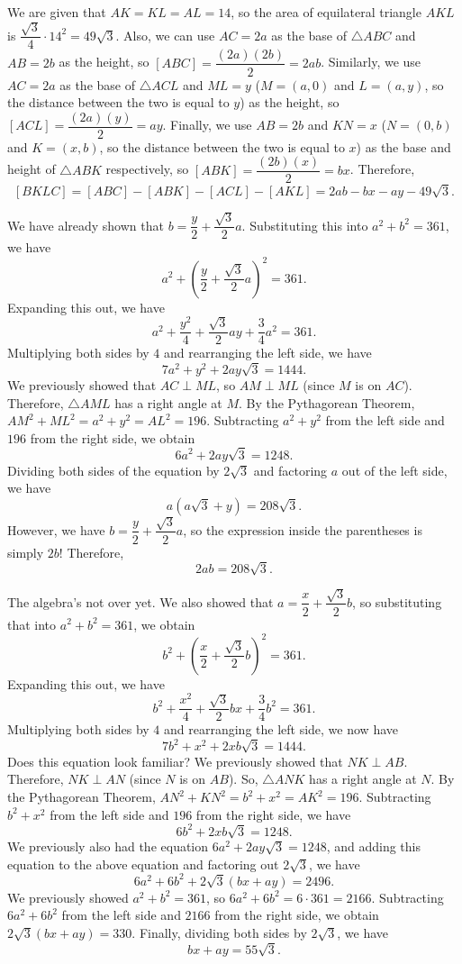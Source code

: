 \begin{enumerate}
 We are given that $AK = KL = AL = 14$, so the area of equilateral triangle $AKL$ is $\dfrac{\sqrt{3}}{4} \cdot 14^2 = 49\sqrt{3}$. Also, we can use $AC = 2a$ as the base of $\triangle ABC$ and $AB = 2b$ as the height, so $[ABC] = \dfrac{(2a)(2b)}{2} = 2ab$. Similarly, we use $AC = 2a$ as the base of $\triangle ACL$ and $ML = y$ ($M = (a, 0)$ and $L = (a, y)$, so the distance between the two is equal to $y$) as the height, so $[ACL] = \dfrac{(2a)(y)}{2} = ay$. Finally, we use $AB = 2b$ and $KN = x$ ($N = (0, b)$ and $K = (x, b)$, so the distance between the two is equal to $x$) as the base and height of $\triangle ABK$ respectively, so $[ABK] = \dfrac{(2b)(x)}{2} = bx$. Therefore, 
 \[[BKLC] = [ABC] - [ABK] - [ACL] - [AKL] = 2ab - bx - ay - 49\sqrt{3}.\]

 We have already shown that $b = \dfrac{y}{2} + \dfrac{\sqrt{3}}{2}a$. Substituting this into $a^2 + b^2 = 361$, we have 
 \[a^2 + \left(\dfrac{y}{2} + \dfrac{\sqrt{3}}{2}a\right)^2 = 361.\] Expanding this out, we have 
 \[a^2 + \dfrac{y^2}{4} + \dfrac{\sqrt{3}}{2}ay + \dfrac{3}{4}a^2 = 361.\] Multiplying both sides by $4$ and rearranging the left side, we have 
 \[7a^2 + y^2 + 2ay\sqrt{3} = 1444.\] We previously showed that $AC \perp ML$, so $AM \perp ML$ (since $M$ is on $AC$). Therefore, $\triangle AML$ has a right angle at $M$. By the Pythagorean Theorem, $AM^2 + ML^2 = a^2 + y^2 = AL^2 = 196$. Subtracting $a^2 + y^2$ from the left side and $196$ from the right side, we obtain 
 \[6a^2 + 2ay\sqrt{3} = 1248.\] Dividing both sides of the equation by $2\sqrt{3}$ and factoring $a$ out of the left side, we have 
 \[a(a\sqrt{3} + y) = 208\sqrt{3}.\] However, we have $b = \dfrac{y}{2} + \dfrac{\sqrt{3}}{2}a$, so the expression inside the parentheses is simply $2b$! Therefore, 
 \[2ab = 208\sqrt{3}.\]

 The algebra’s not over yet. We also showed that $a = \dfrac{x}{2} + \dfrac{\sqrt{3}}{2}b$, so substituting that into $a^2 + b^2 = 361$, we obtain 
 \[b^2 + \left(\dfrac{x}{2} + \dfrac{\sqrt{3}}{2}b\right)^2 = 361.\] Expanding this out, we have 
 \[b^2 + \dfrac{x^2}{4} + \dfrac{\sqrt{3}}{2}bx + \dfrac{3}{4}b^2 = 361.\] Multiplying both sides by $4$ and rearranging the left side, we now have 
 \[7b^2 + x^2 + 2xb\sqrt{3} = 1444.\] Does this equation look familiar? We previously showed that $NK \perp AB$. Therefore, $NK \perp AN$ (since $N$ is on $AB$). So, $\triangle ANK$ has a right angle at $N$. By the Pythagorean Theorem, $AN^2 + KN^2 = b^2 + x^2 = AK^2 = 196$. Subtracting $b^2 + x^2$ from the left side and $196$ from the right side, we have 
 \[6b^2 + 2xb\sqrt{3} = 1248.\] We previously also had the equation $6a^2 + 2ay\sqrt{3} = 1248$, and adding this equation to the above equation and factoring out $2\sqrt{3}$, we have 
 \[6a^2 + 6b^2 + 2\sqrt{3}(bx + ay) = 2496.\] We previously showed $a^2 + b^2 = 361$, so $6a^2 + 6b^2 = 6 \cdot 361 = 2166$. Subtracting $6a^2 + 6b^2$ from the left side and $2166$ from the right side, we obtain $2\sqrt{3}(bx + ay) = 330$. Finally, dividing both sides by $2\sqrt{3}$, we have 
 \[bx + ay = 55\sqrt{3}.\]


\end{enumerate}
